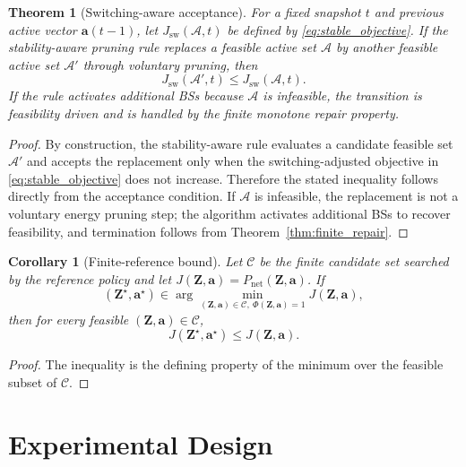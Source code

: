 \documentclass[journal]{IEEEtran}
\newtheorem{theorem}{Theorem}
\newtheorem{corollary}{Corollary}
\begin{document}
\begin{theorem}[Switching-aware acceptance]
For a fixed snapshot $t$ and previous active vector $\mathbf{a}(t-1)$, let
$J_{\mathrm{sw}}(\mathcal{A},t)$ be defined by
\eqref{eq:stable_objective}. If the stability-aware pruning rule replaces a
feasible active set $\mathcal{A}$ by another feasible active set
$\mathcal{A}'$ through voluntary pruning, then
\begin{equation}
    J_{\mathrm{sw}}(\mathcal{A}',t)
    \leq
    J_{\mathrm{sw}}(\mathcal{A},t).
\end{equation}
If the rule activates additional BSs because $\mathcal{A}$ is infeasible, the
transition is feasibility driven and is handled by the finite monotone repair
property.
\end{theorem}
\begin{proof}
By construction, the stability-aware rule evaluates a candidate feasible set
$\mathcal{A}'$ and accepts the replacement only when the switching-adjusted
objective in \eqref{eq:stable_objective} does not increase. Therefore the
stated inequality follows directly from the acceptance condition. If
$\mathcal{A}$ is infeasible, the replacement is not a voluntary energy
pruning step; the algorithm activates additional BSs to recover feasibility,
and termination follows from Theorem~\ref{thm:finite_repair}.
\end{proof}

\begin{corollary}[Finite-reference bound]
Let $\mathcal{C}$ be the finite candidate set searched by the reference policy
and let
$J(\mathbf{Z},\mathbf{a})=P_{\mathrm{net}}(\mathbf{Z},\mathbf{a})$. If
\begin{equation}
    (\mathbf{Z}^{\star},\mathbf{a}^{\star})
    \in\arg\min_{(\mathbf{Z},\mathbf{a})\in\mathcal{C},\ \Phi(\mathbf{Z},\mathbf{a})=1}
    J(\mathbf{Z},\mathbf{a}),
\end{equation}
then for every feasible
$(\mathbf{Z},\mathbf{a})\in\mathcal{C}$,
\begin{equation}
    J(\mathbf{Z}^{\star},\mathbf{a}^{\star})
    \leq J(\mathbf{Z},\mathbf{a}).
\end{equation}
\end{corollary}
\begin{proof}
The inequality is the defining property of the minimum over the feasible subset
of $\mathcal{C}$.
\end{proof}

\section{Experimental Design}
\end{document}
